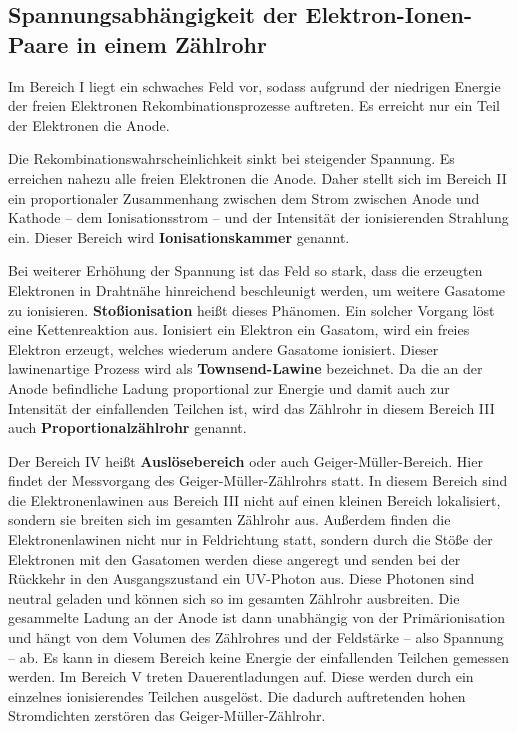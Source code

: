 \subsection{Spannungsabhängigkeit der Elektron-Ionen-Paare in einem Zählrohr}
Im Bereich I liegt ein schwaches Feld vor, sodass aufgrund der niedrigen Energie der
freien Elektronen Rekombinationsprozesse auftreten. Es erreicht nur ein Teil der Elektronen
die Anode.

Die Rekombinationswahrscheinlichkeit sinkt bei steigender Spannung. Es erreichen nahezu alle
freien Elektronen die Anode.
Daher stellt sich im Bereich II ein proportionaler Zusammenhang zwischen dem Strom zwischen
Anode und Kathode -- dem Ionisationsstrom -- und der Intensität der ionisierenden Strahlung ein.
Dieser Bereich wird \textbf{Ionisationskammer} genannt.

Bei weiterer Erhöhung der Spannung ist das Feld so stark, dass die erzeugten Elektronen
in Drahtnähe hinreichend beschleunigt werden, um weitere Gasatome zu ionisieren.
\textbf{Stoßionisation} heißt dieses Phänomen.
Ein solcher Vorgang löst eine Kettenreaktion aus. Ionisiert ein Elektron ein Gasatom,
wird ein freies Elektron erzeugt, welches wiederum andere Gasatome ionisiert.
Dieser lawinenartige Prozess wird als \textbf{Townsend-Lawine} bezeichnet.
Da die an der Anode befindliche Ladung proportional zur Energie und damit auch zur Intensität
der einfallenden Teilchen ist, wird das Zählrohr in diesem Bereich III auch
\textbf{Proportionalzählrohr} genannt.

Der Bereich IV heißt \textbf{Auslösebereich} oder auch Geiger-Müller-Bereich. Hier findet
der Messvorgang des Geiger-Müller-Zählrohrs statt.
In diesem Bereich sind die Elektronenlawinen aus Bereich III nicht auf einen kleinen Bereich
lokalisiert, sondern sie breiten sich im gesamten Zählrohr aus. Außerdem finden die
Elektronenlawinen nicht nur in Feldrichtung statt, sondern durch die Stöße der Elektronen mit
den Gasatomen werden diese angeregt und senden bei der Rückkehr in den Ausgangszustand
ein UV-Photon aus. Diese Photonen sind neutral geladen und können sich so im gesamten
Zählrohr ausbreiten.
Die gesammelte Ladung an der Anode ist dann unabhängig von der Primärionisation und hängt
von dem Volumen des Zählrohres und der Feldstärke -- also Spannung -- ab.
Es kann in diesem Bereich keine Energie der einfallenden Teilchen gemessen werden.
Im Bereich V treten Dauerentladungen auf. Diese werden durch ein einzelnes ionisierendes Teilchen
ausgelöst. Die dadurch auftretenden hohen Stromdichten zerstören das Geiger-Müller-Zählrohr.
\FloatBarrier
